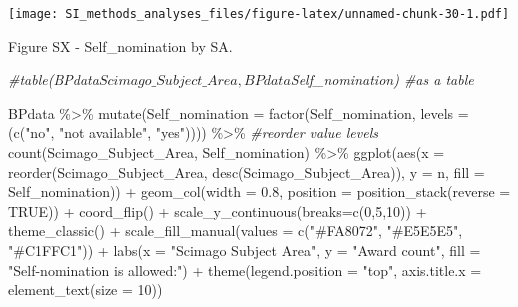 \documentclass[
]{article}
\newenvironment{Shaded}{\begin{snugshade}}{\end{snugshade}}
\newcommand{\AttributeTok}[1]{\textcolor[rgb]{0.77,0.63,0.00}{#1}}
\newcommand{\CommentTok}[1]{\textcolor[rgb]{0.56,0.35,0.01}{\textit{#1}}}
\newcommand{\ConstantTok}[1]{\textcolor[rgb]{0.00,0.00,0.00}{#1}}
\newcommand{\DecValTok}[1]{\textcolor[rgb]{0.00,0.00,0.81}{#1}}
\newcommand{\FloatTok}[1]{\textcolor[rgb]{0.00,0.00,0.81}{#1}}
\newcommand{\FunctionTok}[1]{\textcolor[rgb]{0.00,0.00,0.00}{#1}}
\newcommand{\NormalTok}[1]{#1}
\newcommand{\SpecialCharTok}[1]{\textcolor[rgb]{0.00,0.00,0.00}{#1}}
\newcommand{\StringTok}[1]{\textcolor[rgb]{0.31,0.60,0.02}{#1}}
\begin{document}
\texttt{[image: SI\_methods\_analyses\_files/figure-latex/unnamed-chunk-30-1.pdf]}

Figure SX - Self\_nomination by SA.

\begin{Shaded}
\begin{Highlighting}[]
\CommentTok{\#table(BPdata$Scimago\_Subject\_Area, BPdata$Self\_nomination) \#as a table}

\NormalTok{BPdata }\SpecialCharTok{\%\textgreater{}\%} 
    \FunctionTok{mutate}\NormalTok{(}\AttributeTok{Self\_nomination =} \FunctionTok{factor}\NormalTok{(Self\_nomination, }\AttributeTok{levels =}\NormalTok{ (}\FunctionTok{c}\NormalTok{(}\StringTok{"no"}\NormalTok{, }\StringTok{"not available"}\NormalTok{, }\StringTok{"yes"}\NormalTok{)))) }\SpecialCharTok{\%\textgreater{}\%} \CommentTok{\#reorder value levels}
    \FunctionTok{count}\NormalTok{(Scimago\_Subject\_Area, Self\_nomination) }\SpecialCharTok{\%\textgreater{}\%}
    \FunctionTok{ggplot}\NormalTok{(}\FunctionTok{aes}\NormalTok{(}\AttributeTok{x =} \FunctionTok{reorder}\NormalTok{(Scimago\_Subject\_Area, }\FunctionTok{desc}\NormalTok{(Scimago\_Subject\_Area)), }\AttributeTok{y =}\NormalTok{ n, }\AttributeTok{fill =}\NormalTok{ Self\_nomination)) }\SpecialCharTok{+} 
    \FunctionTok{geom\_col}\NormalTok{(}\AttributeTok{width =} \FloatTok{0.8}\NormalTok{, }\AttributeTok{position =} \FunctionTok{position\_stack}\NormalTok{(}\AttributeTok{reverse =} \ConstantTok{TRUE}\NormalTok{)) }\SpecialCharTok{+}
    \FunctionTok{coord\_flip}\NormalTok{() }\SpecialCharTok{+}
    \FunctionTok{scale\_y\_continuous}\NormalTok{(}\AttributeTok{breaks=}\FunctionTok{c}\NormalTok{(}\DecValTok{0}\NormalTok{,}\DecValTok{5}\NormalTok{,}\DecValTok{10}\NormalTok{)) }\SpecialCharTok{+}
    \FunctionTok{theme\_classic}\NormalTok{() }\SpecialCharTok{+} 
    \FunctionTok{scale\_fill\_manual}\NormalTok{(}\AttributeTok{values =} \FunctionTok{c}\NormalTok{(}\StringTok{"\#FA8072"}\NormalTok{, }\StringTok{"\#E5E5E5"}\NormalTok{, }\StringTok{"\#C1FFC1"}\NormalTok{)) }\SpecialCharTok{+}
    \FunctionTok{labs}\NormalTok{(}\AttributeTok{x =} \StringTok{"Scimago Subject Area"}\NormalTok{, }\AttributeTok{y =} \StringTok{"Award count"}\NormalTok{, }\AttributeTok{fill =} \StringTok{"Self{-}nomination is allowed:"}\NormalTok{) }\SpecialCharTok{+} 
    \FunctionTok{theme}\NormalTok{(}\AttributeTok{legend.position =} \StringTok{"top"}\NormalTok{, }\AttributeTok{axis.title.x =} \FunctionTok{element\_text}\NormalTok{(}\AttributeTok{size =} \DecValTok{10}\NormalTok{))}
\end{Highlighting}
\end{Shaded}
\end{document}
